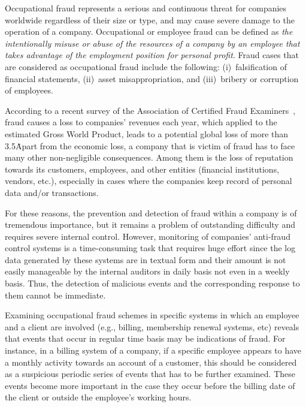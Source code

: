 \documentclass[conference]{IEEEtran}
\begin{document}
Occupational fraud represents a serious and continuous threat for
companies worldwide regardless of their size or type, and may cause
severe damage to the operation of a company. Occupational or
employee fraud can be defined as \emph{the intentionally misuse or
abuse of the resources of a company by an employee that takes
advantage of the employment position for personal profit}. Fraud
cases that are considered as occupational fraud include the
following: (i)~falsification of financial statements, (ii)~asset
misappropriation, and (iii)~bribery or corruption of employees.

According to a recent survey of the Association of Certified Fraud
Examiners~\cite{ACFE12}, fraud causes a  loss to companies'
revenues each year, which applied to the estimated  Gross
World Product, leads to a potential global loss of more than 3.5\. Apart from the economic loss, a company
that is victim of fraud has to face many other non-negligible
consequences. Among them is the loss of reputation towards its
customers, employees, and other entities (financial institutions,
vendors, etc.), especially in cases where the companies keep record
of personal data and/or transactions.

For these reasons, the prevention and detection of fraud within a
company is of tremendous importance, but it remains a problem of
outstanding difficulty and requires severe internal control.
However, monitoring of companies' anti-fraud control systems is a
time-consuming task that requires huge effort since the log data
generated by these systems are in textual form and their amount is
not easily manageable by the internal auditors in daily basis not
even in a weekly basis. Thus, the detection of malicious events and
the corresponding response to them cannot be immediate.

Examining occupational fraud schemes in specific systems in which an
employee and a client are involved (e.g., billing, membership
renewal systems, etc) reveals that events that occur in regular time
basis may be indications of fraud. For instance, in a billing system
of a company, if a specific employee appears to have a monthly
activity towards an account of a customer, this should be considered
as a suspicious periodic series of events that has to be further
examined. These events become more important in the case they occur
before the billing date of the client or outside the employee's
working hours.
\end{document}
